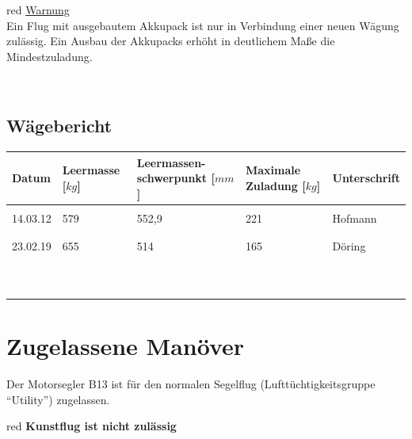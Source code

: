 \begin{color}{red}
\large{\underline{Warnung}}\\
Ein Flug mit ausgebautem Akkupack ist nur in Verbindung einer neuen Wägung zulässig. Ein Ausbau der Akkupacks erhöht in deutlichem Maße die Mindestzuladung.
\end{color}\\

\subsection{Wägebericht}

\begin{tiny}
\begin{tabular}{|m{}|m{}|m{2cm}|m{}|m{}|}
\hline
Datum & Leermasse [$\unit{kg}$] & Leermassen- schwerpunkt [$\unit{mm}$]  & Maximale Zuladung [$\unit{kg}$] & Unterschrift\\

\hline
& & & &\\
14.03.12 & 579 & 552,9 & 221 & Hofmann\\
& & & &\\
\hline
& & & &\\
23.02.19 & 655 & 514 & 165 & Döring\\
& & & &\\
\hline
& & & &\\
& & & &\\
& & & &\\
\hline
& & & &\\
& & & &\\
& & & &\\
\hline
& & & &\\
& & & &\\
& & & &\\
\hline

\end{tabular}
\end{tiny}


\section{Zugelassene Manöver}
Der Motorsegler B13 ist für den normalen Segelflug (Lufttüchtigkeitsgruppe "`Utility"') zugelassen.\\
\newline
\begin{color}{red}
\textbf{Kunstflug ist nicht zulässig}
\end{color}

